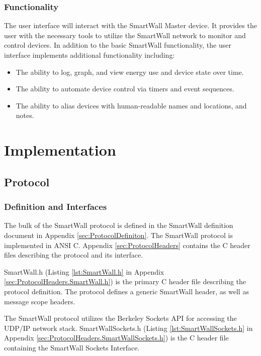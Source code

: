 \documentclass[11pt]{article}
\begin{document}
\subsubsection{Functionality}
The user interface will interact with the SmartWall Master device. It
provides the user with the necessary tools to utilize the SmartWall
network to monitor and control devices. In addition to the basic
SmartWall functionality, the user interface implements additional
functionality including:
\begin{itemize}
  \setlength{\itemsep}{0pt}
  \setlength{\parskip}{0pt}
  \setlength{\parsep}{0pt}
\item The ability to log, graph, and view energy use and device state
  over time.
\item The ability to automate device control via timers and event
  sequences.
\item The ability to alias devices with human-readable names and
  locations, and notes.
\end{itemize}  

\section{Implementation}
\subsection{Protocol}
\subsubsection{Definition and Interfaces}

The bulk of the SmartWall protocol is defined in the SmartWall
definition document in Appendix \ref{sec:ProtocolDefiniton}. The
SmartWall protocol is implemented in ANSI C. Appendix
\ref{sec:ProtocolHeaders} contains the C header files describing the protocol
and its interface.

SmartWall.h (Listing
\ref{lst:SmartWall.h} in Appendix \ref{sec:ProtocolHeaders.SmartWall.h}) is
the primary C header file describing the protocol definition. The
protocol defines a generic SmartWall header, as well as message scope
headers.

The SmartWall protocol utilizes the Berkeley Sockets API for accessing
the UDP/IP network stack. SmartWallSockets.h (Listing
\ref{lst:SmartWallSockets.h} in Appendix
\ref{sec:ProtocolHeaders.SmartWallSockets.h}) is the C header file containing
the SmartWall Sockets Interface.
\end{document}
